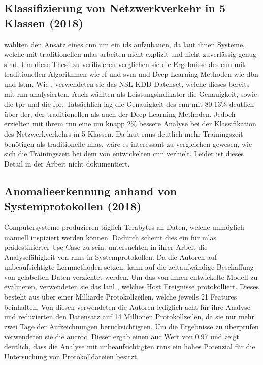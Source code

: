\documentclass[
    12pt, %
    DIV10,
    ngerman, %
    a4paper, %
    oneside, %
    titlepage, %
    parskip=half, %
    headings=normal, %
    listof=totoc, %
    bibliography=totoc, %
    index=totoc, %
    captions=tableheading, %
    final %
]{scrreprt}
\begin{document}
\subsection{Klassifizierung von Netzwerkverkehr in 5 Klassen (2018)}\label{ding}
\textcite{Ding2018} wählten den Ansatz eines \ac{cnn} um ein \ac{ids} aufzubauen, da laut ihnen Systeme, welche mit traditionellen \ac{mlas} arbeiten nicht explizit und nicht zuverlässig genug sind. Um diese These zu verifizieren verglichen sie die Ergebnisse des \ac{cnn} mit traditionellen Algorithmen wie \ac{rf} und \ac{svm} und Deep Learning Methoden wie \ac{dbn} und \ac{lstm}. Wie \textcite{Yin2017}, verwendeten sie das NSL-KDD Datenset, welche dieses bereits mit \ac{rnn} analysierten. Auch \textcite{Ding2018} wählten als Leistungsindikator die Genauigkeit, sowie die \ac{tpr} und die \ac{fpr}. Tatsächlich lag die Genauigkeit des \ac{cnn} mit 80.13\% deutlich über der, der traditionellen als auch der Deep Learning Methoden. Jedoch erzielten \textcite{Yin2017} mit ihrem \ac{rnn} eine um knapp 2\% bessere Analyse bei der Klassifikation des Netzwerkverkehrs in 5 Klassen. Da laut \textcite{Yin2017} \ac{rnns} deutlich mehr Trainingszeit benötigen als traditionelle \ac{mlas}, wäre es interessant zu vergleichen gewesen, wie sich die Trainingszeit bei dem von \textcite{Ding2018} entwickelten \ac{cnn} verhielt. Leider ist dieses Detail in der Arbeit nicht dokumentiert.
%
\subsection{Anomalieerkennung anhand von Systemprotokollen (2018)}\label{brown}
Computersysteme produzieren täglich Terabytes an Daten, welche unmöglich manuell inspiziert werden können. Dadurch scheint dies ein für \ac{mlas} prädestinierter Use Case zu sein. \textcite{Brown2018} untersuchten in ihrer Arbeit die Analysefähigkeit von \ac{rnns} in Systemprotokollen. Da die Autoren auf unbeaufsichtigte Lernmethoden setzen, kann auf die zeitaufwändige Beschaffung von gelabelten Daten verzichtet werden. Um das von ihnen entwickelte Modell zu evaluieren, verwendeten sie das \ac{lanl} \parencite{akent-2015-enterprise-data}, welches Host Ereignisse protokolliert. Dieses besteht aus über einer Milliarde Protokollzeilen, welche jeweils 21 Features beinhalten. Von diesen verwendeten die Autoren lediglich acht für ihre Analyse und reduzierten den Datensatz auf 14 Millionen Protokollzeilen, da sie nur mehr zwei Tage der Aufzeichnungen berücksichtigten. Um die Ergebnisse zu überprüfen verwendeten sie die \ac{aucroc}. Dieser ergab einen \ac{auc} Wert von 0.97 und zeigt deutlich, dass die Analyse mit unbeaufsichtigten \ac{rnns} ein hohes Potenzial für die Untersuchung von Protokolldateien besitzt.
%
\end{document}
